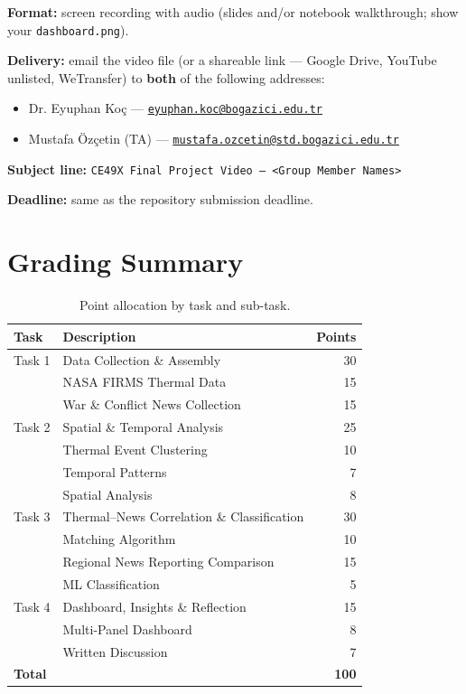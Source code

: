 \documentclass[11pt]{article}
\begin{document}
\noindent\textbf{Format:} screen recording with audio (slides and/or notebook walkthrough; show your \texttt{dashboard.png}).

\smallskip
\noindent\textbf{Delivery:} email the video file (or a shareable link --- Google Drive, YouTube unlisted, WeTransfer) to \textbf{both} of the following addresses:
\begin{itemize}
  \item Dr. Eyuphan Ko\c{c} --- \href{mailto:eyuphan.koc@bogazici.edu.tr}{\texttt{eyuphan.koc@bogazici.edu.tr}}
  \item Mustafa \"Oz\c{c}etin (TA) --- \href{mailto:mustafa.ozcetin@std.bogazici.edu.tr}{\texttt{mustafa.ozcetin@std.bogazici.edu.tr}}
\end{itemize}

\noindent\textbf{Subject line:} \texttt{CE49X Final Project Video --- <Group Member Names>}

\smallskip
\noindent\textbf{Deadline:} same as the repository submission deadline.

\section{Grading Summary}

\begin{table}[h]
\centering
\begin{tabular}{llr}
\toprule
\textbf{Task} & \textbf{Description} & \textbf{Points} \\
\midrule
Task 1 & Data Collection \& Assembly                & 30 \\
       & \quad NASA FIRMS Thermal Data              & 15 \\
       & \quad War \& Conflict News Collection      & 15 \\
\midrule
Task 2 & Spatial \& Temporal Analysis               & 25 \\
       & \quad Thermal Event Clustering             & 10 \\
       & \quad Temporal Patterns                    &  7 \\
       & \quad Spatial Analysis                     &  8 \\
\midrule
Task 3 & Thermal--News Correlation \& Classification & 30 \\
       & \quad Matching Algorithm                   & 10 \\
       & \quad Regional News Reporting Comparison   & 15 \\
       & \quad ML Classification                    &  5 \\
\midrule
Task 4 & Dashboard, Insights \& Reflection          & 15 \\
       & \quad Multi-Panel Dashboard                &  8 \\
       & \quad Written Discussion                   &  7 \\
\midrule
\textbf{Total} &                                    & \textbf{100} \\
\bottomrule
\end{tabular}
\caption{Point allocation by task and sub-task.}
\end{table}
\end{document}

